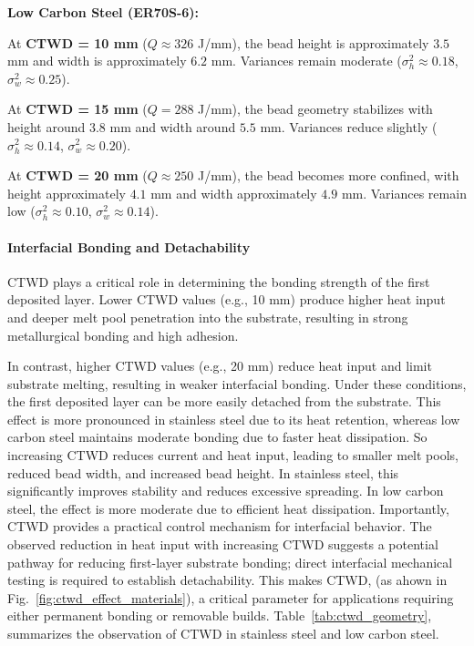 \documentclass[conference]{IEEEtran}
\begin{document}
\textbf{Low Carbon Steel (ER70S-6):}

At \textbf{CTWD = 10 mm} ($Q \approx 326$ J/mm), the bead height is approximately $3.5$ mm and width is approximately $6.2$ mm. Variances remain moderate ($\sigma_h^2 \approx 0.18$, $\sigma_w^2 \approx 0.25$).

At \textbf{CTWD = 15 mm} ($Q = 288$ J/mm), the bead geometry stabilizes with height around $3.8$ mm and width around $5.5$ mm. Variances reduce slightly ($\sigma_h^2 \approx 0.14$, $\sigma_w^2 \approx 0.20$).

At \textbf{CTWD = 20 mm} ($Q \approx 250$ J/mm), the bead becomes more confined, with height approximately $4.1$ mm and width approximately $4.9$ mm. Variances remain low ($\sigma_h^2 \approx 0.10$, $\sigma_w^2 \approx 0.14$).

\paragraph{Interfacial Bonding and Detachability}

CTWD plays a critical role in determining the bonding strength of the first deposited layer. Lower CTWD values (e.g., 10 mm) produce higher heat input and deeper melt pool penetration into the substrate, resulting in strong metallurgical bonding and high adhesion.

In contrast, higher CTWD values (e.g., 20 mm) reduce heat input and limit substrate melting, resulting in weaker interfacial bonding. Under these conditions, the first deposited layer can be more easily detached from the substrate. This effect is more pronounced in stainless steel due to its heat retention, whereas low carbon steel maintains moderate bonding due to faster heat dissipation. So increasing CTWD reduces current and heat input, leading to smaller melt pools, reduced bead width, and increased bead height. In stainless steel, this significantly improves stability and reduces excessive spreading. In low carbon steel, the effect is more moderate due to efficient heat dissipation. Importantly, CTWD provides a practical control mechanism for interfacial behavior. The observed reduction in heat input with increasing CTWD suggests a potential pathway for reducing first-layer substrate bonding; direct interfacial mechanical testing is required to establish detachability. This makes CTWD, (as ahown in Fig.~\ref{fig:ctwd_effect_materials}), a critical parameter for applications requiring either permanent bonding or removable builds. Table~\ref{tab:ctwd_geometry}, summarizes the observation of CTWD in stainless steel and low carbon steel.
\end{document}
